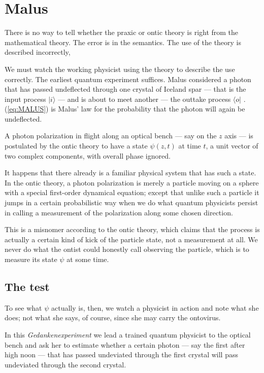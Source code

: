 \documentclass[a4paper,11pt]{article}
\begin{document}
\section{Malus}

There is no way 
to tell whether the praxic or ontic theory
is right  from the mathematical theory.
The error is in the semantics.
The use of the theory is described incorrectly,

We must watch the working physicist using the theory
to describe the use correctly.
The earliest quantum experiment suffices.
Malus \cite{MALUS} considered  a photon that has
passed undeflected  through one crystal of Iceland spar
--- that is
the input process $|i\rangle$ ---
and is about to meet another --- 
the outtake process  $\langle o|$ .
(\ref{eq:MALUS}) is Malus' law
for the probability that the photon 
will again be undeflected.

A photon polarization in flight along an optical bench
--- say on the $z$ axis --- is postulated
by the ontic theory to have a state
$\psi(z,t)$ at time $t$,
a unit vector of two complex components,
with overall phase ignored.

It happens that there already is a familiar physical system 
that has such a state.
In the ontic theory, a photon polarization
is merely a particle moving on a sphere
with a special first-order dynamical equation;
except that unlike such a particle
it jumps in a certain probabilistic way
when 
we do what quantum physicists 
persist in calling
a measurement of the polarization
along some chosen direction.

This is a misnomer according to the ontic theory,
which claims that the process is actually a 
certain kind of kick of the particle state,
not a measurement at all.
We never do what the ontist
could honestly call observing the particle,
which is  to measure its state $\psi$
at some time.


\subsection{The test}

To see what $\psi$ actually is, then,
we watch a physicist in action
and note what she does;
not what she says,
of course,
since she may carry the ontovirus.

In this {\em Gedankenexperiment}  
we lead a trained quantum physicist
to the optical bench and ask her
 to estimate whether a certain photon
--- say the first after high noon ---
that has passed undeviated through the first crystal will pass
undeviated through the second crystal.
\end{document}
